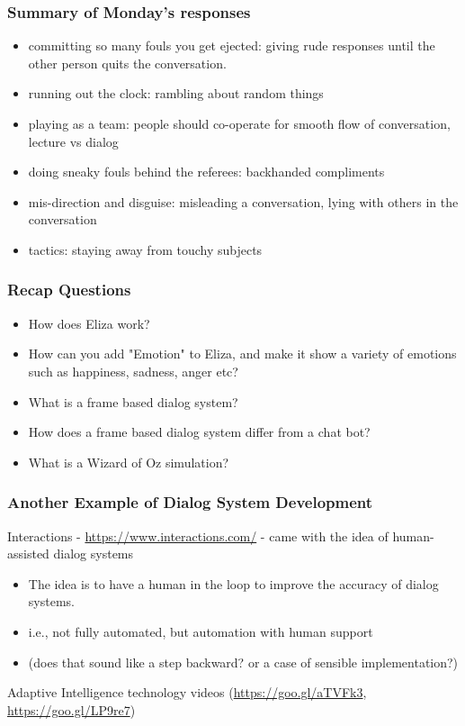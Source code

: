 \documentclass{beamer}
\begin{document}
\begin{frame}
\frametitle{Summary of Monday's responses}
\begin{itemize}
\item committing so many fouls you get ejected: giving rude responses until the other person quits the conversation.
\item running out the clock: rambling about random things
\item playing as a team: people should co-operate for smooth flow of conversation, lecture vs dialog
\item doing sneaky fouls behind the referees: backhanded compliments
\item mis-direction and disguise: misleading a conversation, lying with others in the conversation
\item tactics: staying away from touchy subjects
\end{itemize}	
\end{frame}

\begin{frame}
\frametitle{Recap Questions}
\begin{itemize}
\item How does Eliza work?  \pause
\item How can you add "Emotion" to Eliza, and make it show a variety of emotions such as happiness, sadness, anger etc? \pause
\item What is a frame based dialog system? \pause
\item How does a frame based dialog system differ from a chat bot? \pause
\item What is a Wizard of Oz simulation?
\end{itemize}	
\end{frame}

\begin{frame}
\frametitle{Another Example of Dialog System Development}
Interactions - \url{https://www.interactions.com/} - came with the idea of human-assisted dialog systems
\begin{itemize}
\item The idea is to have a human in the loop to improve the accuracy of dialog systems. 
\item i.e., not fully automated, but automation with human support 
\item (does that sound like a step backward? or a case of sensible implementation?)
\end{itemize}	
Adaptive Intelligence technology videos (\url{https://goo.gl/aTVFk3}, \url{https://goo.gl/LP9re7}) 
\end{frame}
\end{document}
